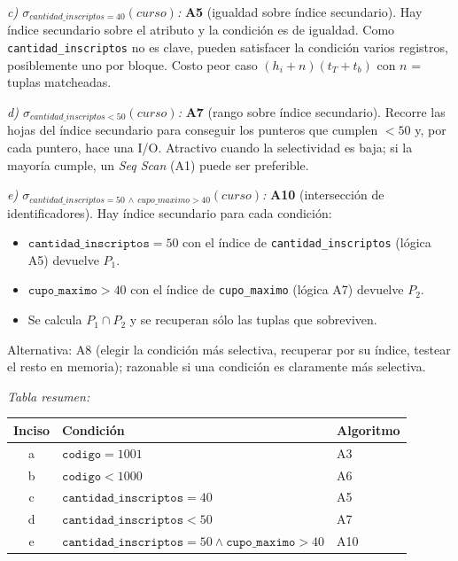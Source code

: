 \documentclass[11pt,a4paper]{article}
\newcommand{\sel}[1]{\sigma_{#1}}
\begin{document}
\textit{c) $\sel{cantidad\_inscriptos = 40}(curso)$:} \textbf{A5} (igualdad sobre índice secundario). Hay índice secundario sobre el atributo y la condición es de igualdad. Como \texttt{cantidad\_inscriptos} no es clave, pueden satisfacer la condición varios registros, posiblemente uno por bloque. Costo peor caso $(h_i + n)(t_T+t_b)$ con $n$ = tuplas matcheadas.

\textit{d) $\sel{cantidad\_inscriptos < 50}(curso)$:} \textbf{A7} (rango sobre índice secundario). Recorre las hojas del índice secundario para conseguir los punteros que cumplen $< 50$ y, por cada puntero, hace una I/O. Atractivo cuando la selectividad es baja; si la mayoría cumple, un \emph{Seq Scan} (A1) puede ser preferible.

\textit{e) $\sel{cantidad\_inscriptos = 50 \,\wedge\, cupo\_maximo > 40}(curso)$:} \textbf{A10} (intersección de identificadores). Hay índice secundario para cada condición:

\begin{itemize}
    \item $\texttt{cantidad\_inscriptos} = 50$ con el índice de \texttt{cantidad\_inscriptos} (lógica A5) devuelve $P_1$.
    \item $\texttt{cupo\_maximo} > 40$ con el índice de \texttt{cupo\_maximo} (lógica A7) devuelve $P_2$.
    \item Se calcula $P_1 \cap P_2$ y se recuperan sólo las tuplas que sobreviven.
\end{itemize}

Alternativa: A8 (elegir la condición más selectiva, recuperar por su índice, testear el resto en memoria); razonable si una condición es claramente más selectiva.

\textit{Tabla resumen:}

\begin{center}
\begin{tabular}{cll}
\toprule
Inciso & Condición & Algoritmo \\
\midrule
a & $\texttt{codigo} = 1001$                            & A3 \\
b & $\texttt{codigo} < 1000$                            & A6 \\
c & $\texttt{cantidad\_inscriptos} = 40$                & A5 \\
d & $\texttt{cantidad\_inscriptos} < 50$                & A7 \\
e & $\texttt{cantidad\_inscriptos}=50 \wedge \texttt{cupo\_maximo}>40$ & A10 \\
\bottomrule
\end{tabular}
\end{center}
\end{document}
